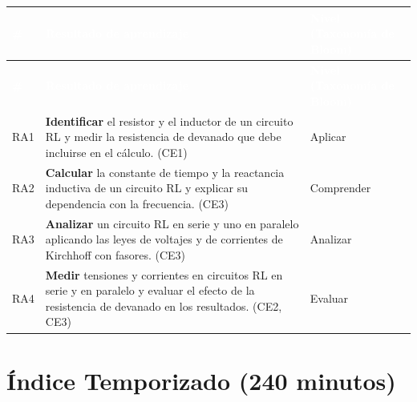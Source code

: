 \documentclass[11pt,letterpaper]{article}
\begin{document}
\begin{xltabular}{\linewidth}{>{\raggedright\arraybackslash}p{1.1cm}>{\raggedright\arraybackslash}X>{\raggedright\arraybackslash}p{3.9cm}}
 \textcolor{white}{\textbf{\#}} & \textcolor{white}{\textbf{Resultado de aprendizaje}} & \textcolor{white}{\textbf{Nivel (Taxonomía de Bloom)}} \\
\endfirsthead
{} \textcolor{white}{\textbf{\#}} & \textcolor{white}{\textbf{Resultado de aprendizaje}} & \textcolor{white}{\textbf{Nivel (Taxonomía de Bloom)}} \\
\endhead
\bottomrule
\endlastfoot
  RA1 & \textbf{Identificar} el resistor y el inductor de un circuito RL y medir la resistencia de devanado que debe incluirse en el cálculo. (CE1) & Aplicar \\
   RA2 & \textbf{Calcular} la constante de tiempo y la reactancia inductiva de un circuito RL y explicar su dependencia con la frecuencia. (CE3) & Comprender \\
  RA3 & \textbf{Analizar} un circuito RL en serie y uno en paralelo aplicando las leyes de voltajes y de corrientes de Kirchhoff con fasores. (CE3) & Analizar \\
   RA4 & \textbf{Medir} tensiones y corrientes en circuitos RL en serie y en paralelo y evaluar el efecto de la resistencia de devanado en los resultados. (CE2, CE3) & Evaluar \\
\end{xltabular}

\section{Índice Temporizado (240 minutos)}
\end{document}
